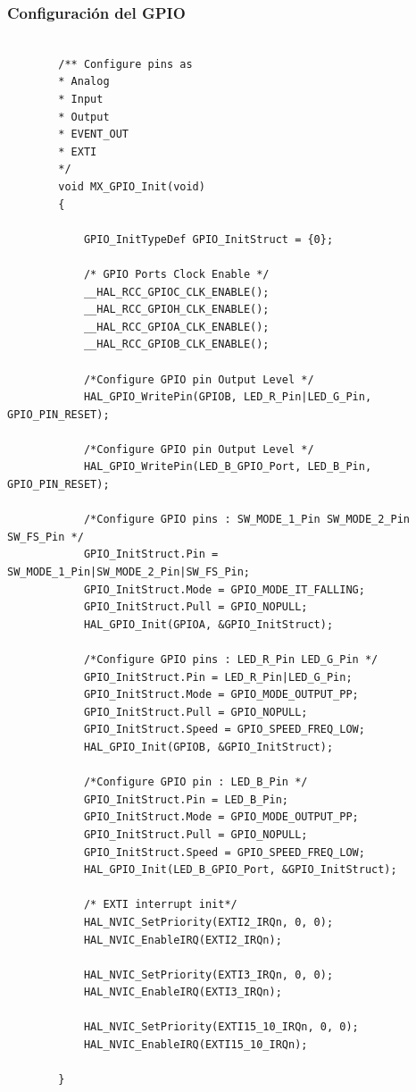 \documentclass[12pt]{article}
\begin{document}
	\subsubsection{Configuración del GPIO}
	\begin{lstlisting}[style=mystyle]
		
		/** Configure pins as
		* Analog
		* Input
		* Output
		* EVENT_OUT
		* EXTI
		*/
		void MX_GPIO_Init(void)
		{
			
			GPIO_InitTypeDef GPIO_InitStruct = {0};
			
			/* GPIO Ports Clock Enable */
			__HAL_RCC_GPIOC_CLK_ENABLE();
			__HAL_RCC_GPIOH_CLK_ENABLE();
			__HAL_RCC_GPIOA_CLK_ENABLE();
			__HAL_RCC_GPIOB_CLK_ENABLE();
			
			/*Configure GPIO pin Output Level */
			HAL_GPIO_WritePin(GPIOB, LED_R_Pin|LED_G_Pin, GPIO_PIN_RESET);
			
			/*Configure GPIO pin Output Level */
			HAL_GPIO_WritePin(LED_B_GPIO_Port, LED_B_Pin, GPIO_PIN_RESET);
			
			/*Configure GPIO pins : SW_MODE_1_Pin SW_MODE_2_Pin SW_FS_Pin */
			GPIO_InitStruct.Pin = SW_MODE_1_Pin|SW_MODE_2_Pin|SW_FS_Pin;
			GPIO_InitStruct.Mode = GPIO_MODE_IT_FALLING;
			GPIO_InitStruct.Pull = GPIO_NOPULL;
			HAL_GPIO_Init(GPIOA, &GPIO_InitStruct);
			
			/*Configure GPIO pins : LED_R_Pin LED_G_Pin */
			GPIO_InitStruct.Pin = LED_R_Pin|LED_G_Pin;
			GPIO_InitStruct.Mode = GPIO_MODE_OUTPUT_PP;
			GPIO_InitStruct.Pull = GPIO_NOPULL;
			GPIO_InitStruct.Speed = GPIO_SPEED_FREQ_LOW;
			HAL_GPIO_Init(GPIOB, &GPIO_InitStruct);
			
			/*Configure GPIO pin : LED_B_Pin */
			GPIO_InitStruct.Pin = LED_B_Pin;
			GPIO_InitStruct.Mode = GPIO_MODE_OUTPUT_PP;
			GPIO_InitStruct.Pull = GPIO_NOPULL;
			GPIO_InitStruct.Speed = GPIO_SPEED_FREQ_LOW;
			HAL_GPIO_Init(LED_B_GPIO_Port, &GPIO_InitStruct);
			
			/* EXTI interrupt init*/
			HAL_NVIC_SetPriority(EXTI2_IRQn, 0, 0);
			HAL_NVIC_EnableIRQ(EXTI2_IRQn);
			
			HAL_NVIC_SetPriority(EXTI3_IRQn, 0, 0);
			HAL_NVIC_EnableIRQ(EXTI3_IRQn);
			
			HAL_NVIC_SetPriority(EXTI15_10_IRQn, 0, 0);
			HAL_NVIC_EnableIRQ(EXTI15_10_IRQn);
			
		}
	\end{lstlisting}
	
\end{document}
